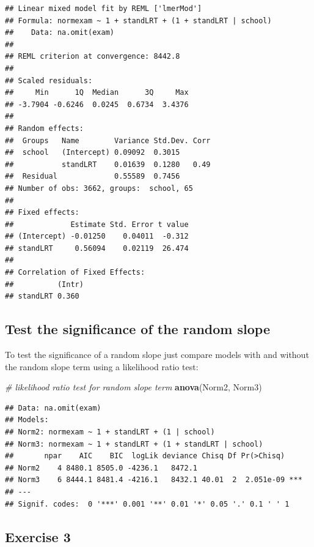 \documentclass[
]{book}
\newenvironment{Shaded}{\begin{snugshade}}{\end{snugshade}}
\newcommand{\CommentTok}[1]{\textcolor[rgb]{0.56,0.35,0.01}{\textit{#1}}}
\newcommand{\KeywordTok}[1]{\textcolor[rgb]{0.13,0.29,0.53}{\textbf{#1}}}
\newcommand{\NormalTok}[1]{#1}
\begin{document}
\begin{verbatim}
## Linear mixed model fit by REML ['lmerMod']
## Formula: normexam ~ 1 + standLRT + (1 + standLRT | school)
##    Data: na.omit(exam)
## 
## REML criterion at convergence: 8442.8
## 
## Scaled residuals: 
##     Min      1Q  Median      3Q     Max 
## -3.7904 -0.6246  0.0245  0.6734  3.4376 
## 
## Random effects:
##  Groups   Name        Variance Std.Dev. Corr
##  school   (Intercept) 0.09092  0.3015       
##           standLRT    0.01639  0.1280   0.49
##  Residual             0.55589  0.7456       
## Number of obs: 3662, groups:  school, 65
## 
## Fixed effects:
##             Estimate Std. Error t value
## (Intercept) -0.01250    0.04011  -0.312
## standLRT     0.56094    0.02119  26.474
## 
## Correlation of Fixed Effects:
##          (Intr)
## standLRT 0.360
\end{verbatim}

\hypertarget{test-the-significance-of-the-random-slope}{%
\subsection{Test the significance of the random slope}\label{test-the-significance-of-the-random-slope}}

To test the significance of a random slope just compare models with and without the random slope term using a likelihood ratio test:

\begin{Shaded}
\begin{Highlighting}[]
  \CommentTok{\# likelihood ratio test for random slope term}
  \KeywordTok{anova}\NormalTok{(Norm2, Norm3) }
\end{Highlighting}
\end{Shaded}

\begin{verbatim}
## Data: na.omit(exam)
## Models:
## Norm2: normexam ~ 1 + standLRT + (1 | school)
## Norm3: normexam ~ 1 + standLRT + (1 + standLRT | school)
##       npar    AIC    BIC  logLik deviance Chisq Df Pr(>Chisq)    
## Norm2    4 8480.1 8505.0 -4236.1   8472.1                        
## Norm3    6 8444.1 8481.4 -4216.1   8432.1 40.01  2  2.051e-09 ***
## ---
## Signif. codes:  0 '***' 0.001 '**' 0.01 '*' 0.05 '.' 0.1 ' ' 1
\end{verbatim}

\hypertarget{exercise-3-1}{%
\subsection{Exercise 3}\label{exercise-3-1}}
\end{document}
